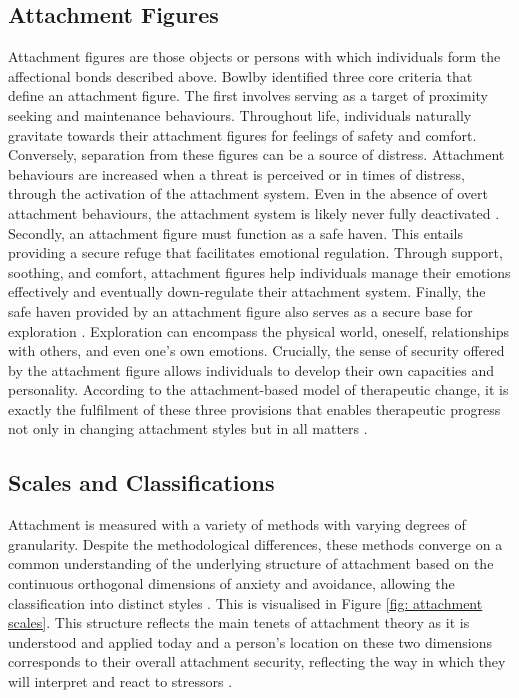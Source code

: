 \documentclass[12pt]{report}
\begin{document}
\subsection*{Attachment Figures}
Attachment figures are those objects or persons with which individuals form the affectional bonds described above.
Bowlby \citeyear{Bowlby1969attachment} identified three core criteria that define an attachment figure.
The first involves serving as a target of proximity seeking and maintenance behaviours.
Throughout life, individuals naturally gravitate towards their attachment figures for feelings of safety and comfort.
Conversely, separation from these figures can be a source of distress.
Attachment behaviours are increased when a threat is perceived or in times of distress, through the activation of the attachment system.
Even in the absence of overt attachment behaviours, the attachment system is likely never fully deactivated \cite{Bowlby1969attachment}.
Secondly, an attachment figure must function as a safe haven. This entails providing a secure refuge that facilitates emotional regulation.
Through support, soothing, and comfort, attachment figures help individuals manage their emotions effectively and eventually down-regulate their attachment system.
Finally, the safe haven provided by an attachment figure also serves as a secure base for exploration \cite{Bowlby1969attachment}.
Exploration can encompass the physical world, oneself, relationships with others, and even one's own emotions.
Crucially, the sense of security offered by the attachment figure allows individuals to develop their own capacities and personality.
According to the attachment-based model of therapeutic change, it is exactly the fulfilment of these three provisions that enables therapeutic progress not only in changing attachment styles but in all matters .

\subsection*{Scales and Classifications}
Attachment is measured with a variety of methods with varying degrees of granularity.
Despite the methodological differences, these methods converge on a common understanding of the underlying structure of attachment based on the continuous orthogonal dimensions of anxiety and avoidance, allowing the classification into distinct styles .
This is visualised in Figure \ref{fig: attachment scales}.
This structure reflects the main tenets of attachment theory as it is understood and applied today and a person's location on these two dimensions corresponds to their overall attachment security, reflecting the way in which they will interpret and react to stressors \cite{Mikulincer2007}.
\end{document}
